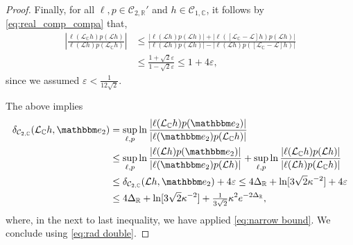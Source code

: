 \documentclass[10pt,a4paper]{amsart}
\newcommand\bC{{\mathbb C}}
\newcommand\bR{{\mathbb R}}
\newcommand\cC{{\mathcal C}}
\newcommand\cL{{\mathcal L}}
\newcommand\ve{\varepsilon}
\newcommand{\bbe}{\mathbbm e}
\begin{document}
\begin{proof}
Finally, for all $\ell,p\in\cC_{2,\bR}'$ and $h\in\cC_{1,\bC}$, it follows by \eqref{eq:real_comp_compa} that,
\[
\begin{split}
\left|\frac{\ell(\cL_{\bC}h)p(\cL h)}{\ell(\cL h)p( \cL_{\bC}h)}\right|&\leq 
\frac{|\ell(\cL h)p(\cL h)|+|\ell([\cL_{\bC}- \cL  ]h)p(\cL h)|}{|\ell(\cL h)p( \cL h)|
-|\ell(\cL h)p([\cL_{\bC}- \cL  ]h)|}\\
&\leq \frac{1+  \sqrt 2\ve}{1- \sqrt 2\ve}  \leq 1 + 4 \ve, 
\end{split}
\]
since we assumed $\ve < \frac 1{ 12 \sqrt{2}}$.


The above implies 
\begin{equation}
\label{eq:needed later}
\begin{split}
\delta_{\cC_{2, \bC}}(\cL_{\bC}h,\bbe_2)&=\sup_{\ell,p}\ln \frac{|\ell(\cL_{\bC}h)p(\bbe_2)|}{|\ell(\bbe_2)p( \cL_{\bC}h)|} \\
&\leq \sup_{\ell,p}\ln \frac{|\ell(\cL h)p(\bbe_2)|}{|\ell(\bbe_2)p( \cL h)|}+\sup_{\ell,p}\ln \frac{|\ell(\cL_{\bC}h)p(\cL h)|}{|\ell(\cL h)p( \cL_{\bC}h)|}\\
&\leq \delta_{\cC_{2, \bC} }(\cL h,\bbe_2)+ 4 \ve
\leq 4\Delta_\bR +  \ln[3 \sqrt 2\kappa^{-2}] + 4  \ve \\
&\leq 4\Delta_\bR +   \ln[3\sqrt 2\kappa^{-2}]+   \tfrac{1}{ 3 \sqrt{2} }  \kappa^2e^{-2\Delta_\bR},
\end{split}
\end{equation}
where, in the next to last inequality, we have applied \eqref{eq:narrow bound}. We conclude using
\eqref{eq:rad double}.
\end{proof}
\end{document}
